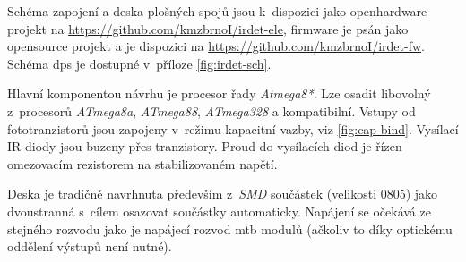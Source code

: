 Schéma zapojení a deska plošných spojů jsou k~dispozici jako openhardware
projekt na \url{https://github.com/kmzbrnoI/irdet-ele}, firmware je psán jako
opensource projekt a je dispozici na
\url{https://github.com/kmzbrnoI/irdet-fw}. Schéma \gls{dps} je dostupné
v~příloze \ref{fig:irdet-sch}.

Hlavní komponentou návrhu je procesor řady \textit{Atmega8*}. Lze osadit
libovolný z~procesorů \textit{ATmega8a}, \textit{ATmega88}, \textit{ATmega328}
a kompatibilní. Vstupy od fototranzistorů jsou zapojeny v~režimu kapacitní
vazby, viz \ref{fig:cap-bind}. Vysílací IR diody jsou buzeny přes tranzistory.
Proud do vysílacích diod je řízen omezovacím rezistorem na stabilizovaném
napětí.

Deska je tradičně navrhnuta především z~\textit{SMD} součástek (velikosti 0805)
jako dvoustranná s~cílem osazovat součástky automaticky. Napájení se očekává
ze stejného rozvodu jako je napájecí rozvod \gls{mtb} modulů (ačkoliv to díky
optickému oddělení výstupů není nutné).
